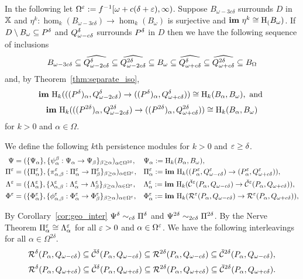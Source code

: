 
In the following let $\Omega^\e := f^{-1}[\ome + c(\of + \e),\infty)$.
Suppose $B_{\omega - 3c\delta}$ surrounds $D$ in $\X$ and $\eta^k : \hom_k(B_{\omega-3c\delta})\to \hom_k(B_\omega)$ is surjective and $\im~\eta^k\cong \hom_(B_\omega)$.
If $D\setminus\B\subseteq\P$ and $\Q^\of$ surrounds $\P$ in $D$ then we have the following sequence of inclusions
\[ B_{\omega - 3c\delta}\subseteq \ext{Q_{\omega-2c\delta}^\delta}\subseteq \ext{Q_{\omega-2c\delta}^{2\delta}}\subseteq \B\subseteq \ext{\QQ^\delta}\subseteq\ext{\QQ^{2\delta}}\subseteq B_{\Omega}\]
and, by Theorem~\ref{thm:separate_iso},
\[\im~\hom_k(((\P)_\alpha,Q_{\omega-2c\delta}^\of)\to ((\P)_\alpha,\QQ^\of))\cong\hom_k(B_\alpha, B_\omega),\text{ and }\]
\[\im~\hom_k(((P^{2\delta})_\alpha,Q_{\omega-2c\delta}^{2\of})\to ((P^{2\of})_\alpha,\QQ^{2\of}))\cong\hom_k(B_\alpha, B_\omega)\]
for $k > 0$ and $\alpha\in\Omega$.

We define the following $k$th persistence modules for $k > 0$ and $\e \geq\delta$.
\begin{align*}
  \Psi &= (\{\Psi_\alpha\}, \{\psi_\alpha^\beta : \Psi_\alpha\to \Psi_\beta\}_{\beta\geq \alpha})_{\alpha\in\Omega^{2\delta}}, & &\Psi_\alpha := \hom_k(B_\alpha, \B),\\
  \Pi^\e &= (\{\Pi^\e_\alpha\}, \{\pi^\e_{\alpha,\beta} : \Pi^\e_\alpha\to \Pi^\e_\beta\}_{\beta\geq \alpha})_{\alpha\in\Omega^\e}, & &\Pi^\e_\alpha := \im~\hom_k((P^\e_\alpha, \Q^\e)\to (P^\e_\alpha, \QQ^\e)),\\
  \Lambda^\e &= (\{\Lambda^\e_\alpha\}, \{\lambda^\e_{\alpha,\beta} : \Lambda^\e_\alpha\to \Lambda^\e_\beta\}_{\beta\geq \alpha})_{\alpha\in\Omega^\e}, & &\Lambda^\e_\alpha := \im~\hom_k(\cech^\e(P_\alpha, \Q)\to \cech^\e(P_\alpha, \QQ)),\\
  \Phi^\e &= (\{\Phi^\e_\alpha\}, \{\phi^\e_{\alpha, \beta} : \Phi^\e_\alpha\to \Phi^\e_\beta\}_{\beta\geq \alpha})_{\alpha\in\Omega^\e}, & &\Phi^\e_\alpha := \im~\hom_k(\rips^\e(P_\alpha, \Q)\to \rips^\e(P_\alpha, \QQ)),
\end{align*}


By Corollary~\ref{cor:geo_inter} $\Psi^\delta\sim_{c\of} \Pi^\delta$ and $\Psi^{2\delta}\sim_{2c\of} \Pi^{2\delta}$.
By the Nerve Theorem $\Pi^\e_\alpha\cong\Lambda^\e_\alpha$ for all $\e > 0$ and $\alpha\in\Omega^\e$.
We have the following interleavings for all $\alpha \in\Omega^{2\delta}$.
\[ \rips^\delta(P_\alpha, \Q)\subseteq \cech^\delta(P_\alpha, \Q) \subseteq \rips^{2\delta}(P_\alpha, \Q)\subseteq \cech^{2\delta}(P_\alpha, \Q),\]
\[ \rips^\delta(P_\alpha, \QQ)\subseteq \cech^\delta(P_\alpha, \QQ) \subseteq \rips^{2\delta}(P_\alpha, \QQ)\subseteq \cech^{2\delta}(P_\alpha, \QQ).\]


